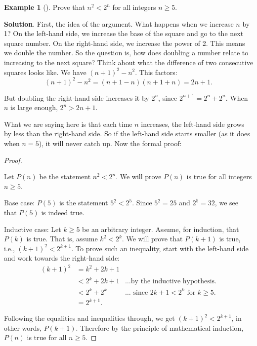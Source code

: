\documentclass[10pt,]{book}
\theoremstyle{plain}
\theoremstyle{definition}
\theoremstyle{definition}
\newtheorem{example}[theorem]{Example}
\theoremstyle{definition}
\theoremstyle{definition}
\numberwithin{equation}{chapter}
\newcommand{\lt}{<}
\newcommand{\amp}{&}
\begin{document}
\begin{example}[]\label{example-76}
\hypertarget{p-2244}{}%
Prove that \(n^2 \lt  2^n\) for all integers \(n \ge 5\).%
\par\smallskip%
\noindent\textbf{Solution}.\hypertarget{solution-200}{}\quad%
\hypertarget{p-2245}{}%
First, the idea of the argument. What happens when we increase \(n\) by 1? On the left-hand side, we increase the base of the square and go to the next square number. On the right-hand side, we increase the power of 2. This means we double the number. So the question is, how does doubling a number relate to increasing to the next square? Think about what the difference of two consecutive squares looks like. We have \((n+1)^2 - n^2\). This factors:%
\begin{equation*}
(n+1)^2 - n^2 = (n+1-n)(n+1+n) = 2n+1.
\end{equation*}
%
\par
\hypertarget{p-2246}{}%
But doubling the right-hand side increases it by \(2^n\), since \(2^{n+1} = 2^n + 2^n\). When \(n\) is large enough, \(2^n > 2n + 1\).%
\par
\hypertarget{p-2247}{}%
What we are saying here is that each time \(n\) increases, the left-hand side grows by less than the right-hand side. So if the left-hand side starts smaller (as it does when \(n = 5\)), it will never catch up. Now the formal proof:%
\begin{proof}\hypertarget{proof-40}{}
\hypertarget{p-2248}{}%
Let \(P(n)\) be the statement \(n^2 \lt  2^n\). We will prove \(P(n)\) is true for all integers \(n \ge 5\).%
\par
\hypertarget{p-2249}{}%
Base case: \(P(5)\) is the statement \(5^2 \lt  2^5\). Since \(5^2 = 25\) and \(2^5 = 32\), we see that \(P(5)\) is indeed true.%
\par
\hypertarget{p-2250}{}%
Inductive case: Let \(k \ge 5\) be an arbitrary integer. Assume, for induction, that \(P(k)\) is true. That is, assume \(k^2 \lt  2^k\). We will prove that \(P(k+1)\) is true, i.e., \((k+1)^2 \lt  2^{k+1}\). To prove such an inequality, start with the left-hand side and work towards the right-hand side:%
\begin{align*}
(k+1)^2 \amp = k^2 + 2k + 1 \amp\\
\amp \lt 2^k + 2k + 1 \amp \ldots\text{by the inductive hypothesis.}\\
\amp \lt 2^k + 2^k \amp \ldots\text{ since } 2k + 1 \lt  2^k \text{ for }k \ge 5.\\
\amp = 2^{k+1}. \amp
\end{align*}
%
\par
\hypertarget{p-2251}{}%
Following the equalities and inequalities through, we get \((k+1)^2 \lt  2^{k+1}\), in other words, \(P(k+1)\). Therefore by the principle of mathematical induction, \(P(n)\) is true for all \(n \ge 5\).%
\end{proof}
\end{example}
\end{document}
